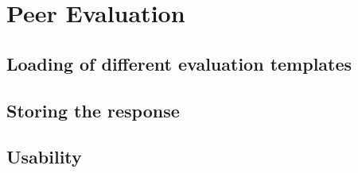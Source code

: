 \chapter{Peer Evaluation}
 
\section{Loading of different evaluation templates}

\section{Storing the response}

\section{Usability}
